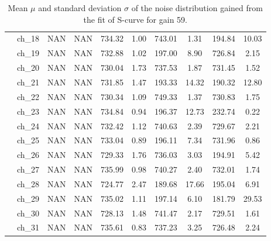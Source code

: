 \begin{table}[H]
{\begin{tabular}{|c|c|c|c|c|c|c|c|c|c|}
    &ch\_18 & NAN & NAN & 734.32 & 1.00 & 743.01 & 1.31 & 194.84 & 10.03 \\
    &ch\_19 & NAN & NAN & 732.88 & 1.02 & 197.00 & 8.90 & 726.84 & 2.15 \\
    &ch\_20 & NAN & NAN & 730.04 & 1.73 & 737.53 & 1.87 & 731.45 & 1.52 \\
    &ch\_21 & NAN & NAN & 731.85 & 1.47 & 193.33 & 14.32 & 190.32 & 12.80 \\
    &ch\_22 & NAN & NAN & 730.34 & 1.09 & 749.33 & 1.37 & 730.83 & 1.75 \\
    &ch\_23 & NAN & NAN & 734.84 & 0.94 & 196.37 & 12.73 & 232.74 & 0.22 \\
    &ch\_24 & NAN & NAN & 732.42 & 1.12 & 740.63 & 2.39 & 729.67 & 2.21 \\
    &ch\_25 & NAN & NAN & 733.04 & 0.89 & 196.11 & 7.34 & 731.96 & 0.86 \\
    &ch\_26 & NAN & NAN & 729.33 & 1.76 & 736.03 & 3.03 & 194.91 & 5.42 \\
    &ch\_27 & NAN & NAN & 735.99 & 0.98 & 740.27 & 2.40 & 732.01 & 1.74 \\
    &ch\_28 & NAN & NAN & 724.77 & 2.47 & 189.68 & 17.66 & 195.04 & 6.91 \\
    &ch\_29 & NAN & NAN & 735.02 & 1.11 & 197.14 & 6.10 & 181.79 & 29.53 \\
    &ch\_30 & NAN & NAN & 728.13 & 1.48 & 741.47 & 2.17 & 729.51 & 1.61 \\
    &ch\_31 & NAN & NAN & 735.61 & 0.83 & 737.23 & 3.25 & 726.48 & 2.24 \\
    \hline
     
\end{tabular}
}
\caption{Mean $\mu$ and standard deviation $\sigma$ of the noise distribution gained from the fit of S-curve for gain 59.}

\end{table}

